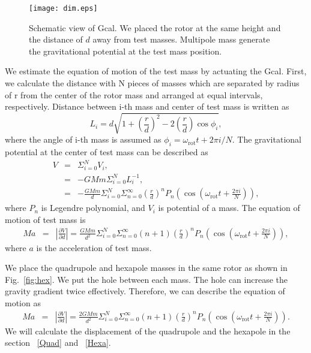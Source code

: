 \documentclass[A4]{spie}  %
\begin{document}

\begin{figure}
\begin{center}
\texttt{[image: dim.eps]}
\caption{Schematic view of Gcal. We placed the rotor at  the same height and the distance of $d$ away from test masses. Multipole mass generate the gravitational potential at the test mass position.}
\label{fig:dim}
\end{center}
\end{figure}
We estimate the equation of motion of the test mass by actuating the Gcal.
First, we calculate the distance with N pieces of masses which are separated by radius of r from the center of the rotor mass and arranged at equal intervals, respectively.
Distance between i-th mass and center of test mass is written as
\begin{equation}
L_i=d \sqrt{1+\left( \frac{r}{d} \right)^2 -2\left( \frac{r}{d} \right) \cos{\phi_i} },
\end{equation}
where the angle of i-th mass is assumed as $\phi_i=\omega_{\mathrm{rot}} t + 2\pi i/N$.
The gravitational potential at the center of test mass can be described as
\begin{eqnarray}
V &=& \Sigma^N_{i=0} V_i, \\
&=& -GMm \Sigma^N_{i=0}L_i^{-1},\\ \label{eq:vpot}
&=&-\frac{G\!M\!m\!}{d} \Sigma^N_{i=0} \Sigma^{\infty}_{n=0}\! \left(\! \frac{r}{d}\! \right)^n
\!P_n\! \left(\! \cos{\!\left( \! \omega_{\mathrm{rot}} t \!+\!\frac{2 \pi i}{N}\right)\!}\right),
\end{eqnarray}
where $P_n$ is Legendre polynomial, and $V_i$ is potential of a mass. The equation of motion of test mass is 
\begin{eqnarray}
Ma&=&\left| \frac{\partial V}{\partial{d}} \right| =\frac{GMm}{d^2}\Sigma^N_{i=0} \Sigma^{\infty}_{n=0}(n+1) \left( \frac{r}{d} \right)^n  P_n\left(\cos{\left(\omega_{\mathrm{rot}} t +\frac{2 \pi i}{N}\right)}\right),
\end{eqnarray}
where $a$ is the acceleration of test mass. 

We place the quadrupole and hexapole masses in the same rotor as shown in Fig.~\ref{fig:hex}. We put the hole between each mass. The hole can increase the gravity gradient twice effectively. Therefore, we can describe the equation of motion as 
\begin{eqnarray}
Ma&=&\left| \frac{\partial V}{\partial{d}} \right| =\frac{2GMm}{d^2}\Sigma^N_{i=0} \Sigma^{\infty}_{n=0}(n+1) \left( \frac{r}{d} \right)^n  P_n\left(\cos{\left(\omega_{\mathrm{rot}} t +\frac{2 \pi i}{N}\right)}\right). \label{eq:EOM}
\end{eqnarray}
We will calculate the displacement of the quadrupole and the hexapole in the section ~\ref{Quad}  and ~\ref{Hexa}.
\end{document}
